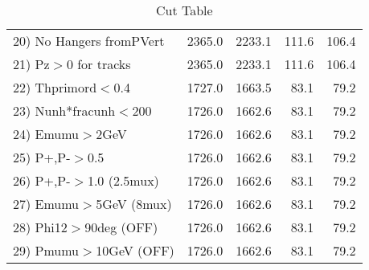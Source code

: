 \begin{table}[h!]
\begin{tabular}{||l||r|r|r|r||}
 20) No Hangers fromPVert &      2365.0 &      2233.1 &       111.6 &       106.4 \\
 21) Pz$>$0 for tracks    &      2365.0 &      2233.1 &       111.6 &       106.4 \\
 22) Thprimord$<$0.4      &      1727.0 &      1663.5 &        83.1 &        79.2 \\
 23) Nunh*fracunh$<$200   &      1726.0 &      1662.6 &        83.1 &        79.2 \\
 24) Emumu$>$2GeV         &      1726.0 &      1662.6 &        83.1 &        79.2 \\
 25) P+,P-$>$0.5          &      1726.0 &      1662.6 &        83.1 &        79.2 \\
 26) P+,P-$>$1.0 (2.5mux) &      1726.0 &      1662.6 &        83.1 &        79.2 \\
 27) Emumu$>$5GeV  (8mux) &      1726.0 &      1662.6 &        83.1 &        79.2 \\
 28) Phi12$>$90deg  (OFF) &      1726.0 &      1662.6 &        83.1 &        79.2 \\
 29) Pmumu$>$10GeV  (OFF) &      1726.0 &      1662.6 &        83.1 &        79.2 \\
 \hline
 \hline
 \end{tabular}
 \caption{Cut Table \cohrp  }
 \label{tab-cut_crhop}
 \end{table}
